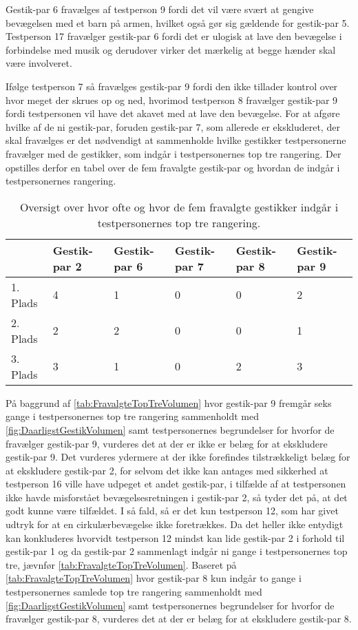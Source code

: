 Gestik-par 6 fravælges af testperson 9 fordi det vil være svært at gengive bevægelsen med et barn på armen, hvilket også gør sig gældende for gestik-par 5. Testperson 17 fravælger gestik-par 6 fordi det er ulogisk at lave den bevægelse i forbindelse med musik og derudover virker det mærkelig at begge hænder skal være involveret. 

Ifølge testperson 7 så fravælges gestik-par 9 fordi den ikke tillader kontrol over hvor meget der skrues op og ned, hvorimod testperson 8 fravælger gestik-par 9 fordi testpersonen vil have det akavet med at lave den bevægelse.\blankline
%
For at afgøre hvilke af de ni gestik-par, foruden gestik-par 7, som allerede er ekskluderet, der skal fravælges er det nødvendigt at sammenholde hvilke gestikker testpersonerne fravælger med de gestikker, som indgår i testpersonernes top tre rangering. Der opstilles derfor en tabel over de fem fravalgte gestik-par og hvordan de indgår i testpersonernes rangering.    
%
\begin{table}[H]
	\centering
	\begin{tabular}{ | p{1.5cm} | p{2.1cm} | p{2.1cm} | p{2.1cm} | p{2.1cm} | p{2.1cm} |}
	\hline
		 & Gestik-par 2 & Gestik-par 6 & Gestik-par 7 & Gestik-par 8 & Gestik-par 9 \\ \hline
		1. Plads & 4 & 1 & 0 & 0 & 2\\ \hline
		2. Plads & 2 & 2 & 0 & 0 & 1\\ \hline
		3. Plads & 3 & 1 & 0 & 2 & 3\\ \hline
	\end{tabular}
	\caption{Oversigt over hvor ofte og hvor de fem fravalgte gestikker indgår i testpersonernes top tre rangering.}
	\label{tab:FravalgteTopTreVolumen}
\end{table}
\noindent
%
På baggrund af \autoref{tab:FravalgteTopTreVolumen} hvor gestik-par 9 fremgår seks gange i testpersonernes top tre rangering sammenholdt med \autoref{fig:DaarligstGestikVolumen} samt testpersonernes begrundelser for hvorfor de fravælger gestik-par 9, vurderes det at der er ikke er belæg for at ekskludere gestik-par 9. Det vurderes ydermere at der ikke forefindes tilstrækkeligt belæg for at ekskludere gestik-par 2, for selvom det ikke kan antages med sikkerhed at testperson 16 ville have udpeget et andet gestik-par, i tilfælde af at testpersonen ikke havde misforstået bevægelsesretningen i gestik-par 2, så tyder det på, at det godt kunne være tilfældet. I så fald, så er det kun testperson 12, som har givet udtryk for at en cirkulærbevægelse ikke foretrækkes. Da det heller ikke entydigt kan konkluderes hvorvidt testperson 12 mindst kan lide gestik-par 2 i forhold til gestik-par 1 og da gestik-par 2 sammenlagt indgår ni gange i testpersonernes top tre, jævnfør \autoref{tab:FravalgteTopTreVolumen}.\blankline 
%
Baseret på \autoref{tab:FravalgteTopTreVolumen} hvor gestik-par 8 kun indgår to gange i testpersonernes samlede top tre rangering sammenholdt med \autoref{fig:DaarligstGestikVolumen} samt testpersonernes begrundelser for hvorfor de fravælger gestik-par 8, vurderes det at der er belæg for at ekskludere gestik-par 8.  

